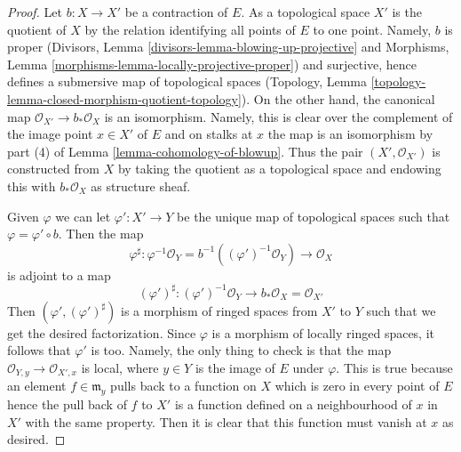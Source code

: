 \documentclass[10pt,a4paper]{amsart}
\theoremstyle{plain}
\theoremstyle{definition}
\theoremstyle{remark}
\numberwithin{equation}{subsection}
\begin{document}
\begin{proof}
Let $b : X \to X'$ be a contraction of $E$. As a topological space
$X'$ is the quotient of $X$ by the relation identifying all points
of $E$ to one point. Namely, $b$ is proper
(Divisors, Lemma \ref{divisors-lemma-blowing-up-projective} and
Morphisms, Lemma \ref{morphisms-lemma-locally-projective-proper})
and surjective, hence defines a submersive map of topological
spaces (Topology, Lemma
\ref{topology-lemma-closed-morphism-quotient-topology}).
On the other hand, the canonical map
$\mathcal{O}_{X'} \to b_*\mathcal{O}_X$ is an isomorphism. Namely,
this is clear over the complement of the image point $x \in X'$ of $E$
and on stalks at $x$ the map is an isomorphism by part (4) of
Lemma \ref{lemma-cohomology-of-blowup}.
Thus the pair $(X', \mathcal{O}_{X'})$ is constructed
from $X$ by taking the quotient as a topological space
and endowing this with $b_*\mathcal{O}_X$ as structure sheaf.

\medskip\noindent
Given $\varphi$ we can let $\varphi' : X' \to Y$ be the unique map of
topological spaces such that $\varphi = \varphi' \circ b$.
Then the map
$$
\varphi^\sharp : \varphi^{-1}\mathcal{O}_Y =
b^{-1}((\varphi')^{-1}\mathcal{O}_Y) \to \mathcal{O}_X
$$
is adjoint to a map
$$
(\varphi')^\sharp :
(\varphi')^{-1}\mathcal{O}_Y \to b_*\mathcal{O}_X = \mathcal{O}_{X'}
$$
Then $(\varphi', (\varphi')^\sharp)$ is a morphism of ringed spaces
from $X'$ to $Y$ such that we get the desired factorization. Since
$\varphi$ is a morphism of locally ringed spaces, it follows that
$\varphi'$ is too. Namely, the only thing to check is that the map
$\mathcal{O}_{Y, y} \to \mathcal{O}_{X', x}$ is local, where $y \in Y$
is the image of $E$ under $\varphi$. This is true because an element
$f \in \mathfrak m_y$ pulls back to a function on $X$ which is zero
in every point of $E$ hence the pull back of $f$ to $X'$ is a function
defined on a neighbourhood of $x$ in $X'$ with the same property.
Then it is clear that this function must vanish at $x$ as desired.
\end{proof}
\end{document}
